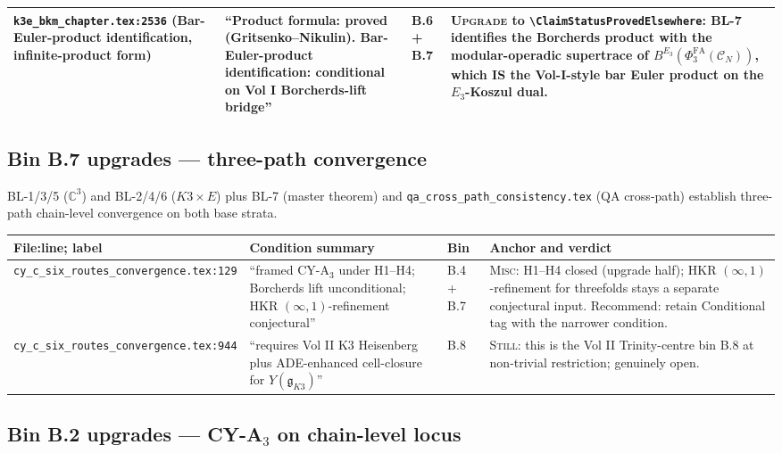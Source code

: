\documentclass[11pt]{amsart}
\providecommand{\PhiFA}{\Phi^{\mathrm{FA}}}
\providecommand{\fg}{\mathfrak{g}}
\providecommand{\C}{\mathbb{C}}
\providecommand{\cC}{\mathcal{C}}
\begin{document}
\begin{longtable}{@{}p{4.2cm}p{3.5cm}p{1.5cm}p{5cm}@{}}
\texttt{k3e\_bkm\_chapter.tex:2536} \newline (Bar-Euler-product identification, infinite-product form)
& ``Product formula: proved (Gritsenko--Nikulin). Bar-Euler-product identification: conditional on Vol I Borcherds-lift bridge''
& B.6 + B.7
& \textsc{Upgrade} to \texttt{\textbackslash ClaimStatusProvedElsewhere}: BL-7 identifies the Borcherds product with the modular-operadic supertrace of $B^{E_3}(\PhiFA_3(\cC_N))$, which IS the Vol-I-style bar Euler product on the $E_3$-Koszul dual. \\

\bottomrule
\end{longtable}

\subsection{Bin B.7 upgrades --- three-path convergence}
\label{subsec:upgrades-b7}

BL-1/3/5 ($\C^3$) and BL-2/4/6 ($K3 \times E$) plus BL-7 (master
theorem) and \texttt{qa\_cross\_path\_consistency.tex} (QA cross-path)
establish three-path chain-level convergence on both base strata.

\begin{longtable}{@{}p{4.2cm}p{3.5cm}p{1.5cm}p{5cm}@{}}
\toprule
File:line; label & Condition summary & Bin & Anchor and verdict \\
\midrule\endhead

\texttt{cy\_c\_six\_routes\_convergence.tex:129} & ``framed CY-A$_3$ under H1--H4; Borcherds lift unconditional; HKR $(\infty,1)$-refinement conjectural'' & B.4 + B.7 & \textsc{Misc}: H1--H4 closed (upgrade half); HKR $(\infty,1)$-refinement for threefolds stays a separate conjectural input. Recommend: retain Conditional tag with the narrower condition. \\

\texttt{cy\_c\_six\_routes\_convergence.tex:944} & ``requires Vol II K3 Heisenberg plus ADE-enhanced cell-closure for $Y(\fg_{K3})$'' & B.8 & \textsc{Still}: this is the Vol II Trinity-centre bin B.8 at non-trivial restriction; genuinely open. \\

\bottomrule
\end{longtable}

\subsection{Bin B.2 upgrades --- CY-A$_3$ on chain-level locus}
\label{subsec:upgrades-b2}
\end{document}
